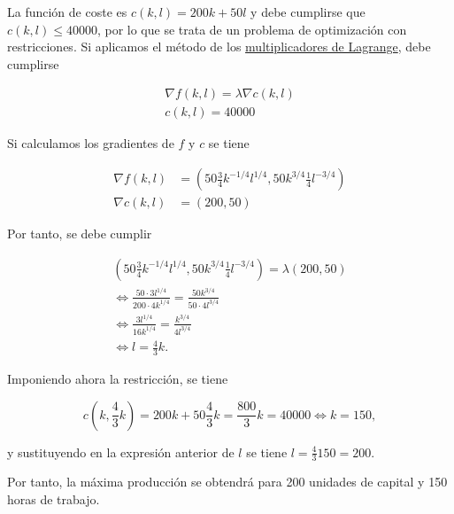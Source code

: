 \documentclass[
  spanish,
  a4paper,
]{scrreport}
\theoremstyle{definition}
\theoremstyle{remark}
\begin{document}
\begin{tcolorbox}[enhanced jigsaw, arc=.35mm, bottomrule=.15mm, bottomtitle=1mm, breakable, colback=white, colbacktitle=quarto-callout-tip-color!10!white, colframe=quarto-callout-tip-color-frame, coltitle=black, left=2mm, leftrule=.75mm, opacityback=0, opacitybacktitle=0.6, rightrule=.15mm, title=\textcolor{quarto-callout-tip-color}{\faLightbulb}\hspace{0.5em}{Solución}, titlerule=0mm, toprule=.15mm, toptitle=1mm]

La función de coste es \(c(k,l) = 200k+50l\) y debe cumplirse que
\(c(k,l)\leq 40000\), por lo que se trata de un problema de optimización
con restricciones. Si aplicamos el método de los
\href{https://aprendeconalf.es/analisis-manual/13-derivadas-funciones-varias-variables.html\#multiplicadores-de-lagrange}{multiplicadores
de Lagrange}, debe cumplirse

\[
\begin{gathered}
\nabla f(k,l) = \lambda\nabla c(k,l)\\
c(k,l) = 40000
\end{gathered}
\]

Si calculamos los gradientes de \(f\) y \(c\) se tiene

\begin{align*}
\nabla f(k,l) 
&= \left(50\frac{3}{4}k^{-1/4}l^{1/4}, 50k^{3/4}\frac{1}{4}l^{-3/4}\right) \\
\nabla c(k,l)
&= (200, 50)
\end{align*}

Por tanto, se debe cumplir

\[
\begin{gathered}
\left(50\frac{3}{4}k^{-1/4}l^{1/4}, 50k^{3/4}\frac{1}{4}l^{-3/4}\right) 
= \lambda(200, 50) \\
\Leftrightarrow \frac{50\cdot 3l^{1/4}}{200\cdot 4 k^{1/4}} = \frac{50 k^{3/4}}{50\cdot 4l^{3/4}} \\
\Leftrightarrow \frac{3l^{1/4}}{16k^{1/4}} = \frac{k^{3/4}}{4l^{3/4}} \\
\Leftrightarrow l = \frac{4}{3}k.
\end{gathered}
\]

Imponiendo ahora la restricción, se tiene

\[
c\left(k,\frac{4}{3}k\right)
= 200k+50\frac{4}{3}k 
= \frac{800}{3}k = 40000
\Leftrightarrow k = 150,
\]

y sustituyendo en la expresión anterior de \(l\) se tiene
\(l=\frac{4}{3}150 = 200\).

Por tanto, la máxima producción se obtendrá para 200 unidades de capital
y 150 horas de trabajo.

\end{tcolorbox}
\end{document}
